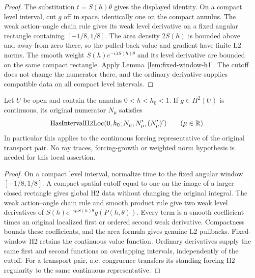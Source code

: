 \begin{proof}
\leanok
The substitution $t=S(h)\theta$ gives the displayed identity.
On a compact level interval, cut $g$ off in space, identically one on
the compact annulus. The weak action--angle chain rule gives its weak
level derivative on a fixed angular rectangle containing $[-1/8,1/8]$.
The area density $2S(h)$ is bounded above and away from zero there, so
the pulled-back value and gradient have finite L2 norms.
The smooth weight $S(h)e^{-i\lambda S(h)\theta}$ and its level derivative
are bounded on the same compact rectangle. Apply
Lemma~\ref{lem:fixed-window-h1}. The cutoff does not change the numerator
there, and the ordinary derivative supplies compatible data on all compact
level intervals.
\end{proof}

\begin{lemma}
\label{lem:numerator-local-h2}
\leanok
Let $U$ be open and contain the annulus $0<h<h_0<1$.
If $g\in H^2(U)$ is continuous, its original numerator $N_\mu$ satisfies
\[
 \operatorname{HasIntervalH2Loc}(0,h_0;N_\mu,N_\mu',(N_\mu')')
 \qquad(\mu\in\mathbb{R}).
\]
In particular this applies to the continuous forcing representative of the
original transport pair. No ray traces, forcing-growth or weighted norm
hypothesis is needed for this local assertion.
\end{lemma}

\begin{proof}
\leanok
On a compact level interval, normalize time to the fixed angular window
$[-1/8,1/8]$. A compact spatial cutoff equal to one on the image of a larger
closed rectangle gives global H2 data without changing the original integral.
The weak action--angle chain rule and smooth product rule give two weak level
derivatives of $S(h)e^{-i\mu S(h)\theta}g(P(h,\theta))$.
Every term is a smooth coefficient times an original localized first or ordered
second weak derivative. Compactness bounds these coefficients, and the area
formula gives genuine L2 pullbacks.
Fixed-window H2 retains the continuous value function.
Ordinary derivatives supply the same first and second functions on overlapping
intervals, independently of the cutoff.
For a transport pair, a.e. congruence transfers its standing forcing H2
regularity to the same continuous representative.
\end{proof}

